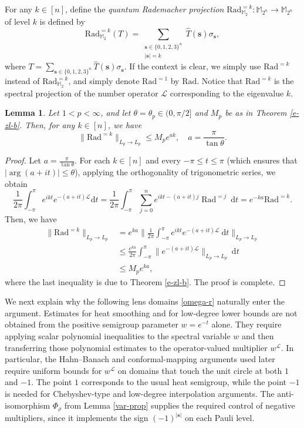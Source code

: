 \documentclass{amsbook}
\newtheorem{lemma}[theorem]{Lemma}
\theoremstyle{definition}
\theoremstyle{remark}
\numberwithin{section}{chapter}
\numberwithin{equation}{chapter}
\newcommand{\1}{\mathbf{1}}
\newcommand{\s}{\mathbf{s}}
\begin{document}
For any $k\in [n]$, define the \emph{quantum Rademacher projection} $\mathrm{Rad}^{=k}_{\mathbb{M}_2}:\mathbb{M}_{2^n}\to\mathbb{M}_{2^n}$ of level $k$ is defined by
\begin{equation}
\mathrm{Rad}^{=k}_{\mathbb{M}_2}(T) = \sum_{\substack{\mathbf{s} \in \{0,1,2,3\}^n \\ |\mathbf{s}| =k}} \widehat{T}(\mathbf{s}) \sigma_{\mathbf{s}},
\end{equation}
where $T=\sum_{\mathbf{s} \in \{0,1,2,3\}^n} \widehat{T}(\mathbf{s}) \sigma_{\mathbf{s}}$. If the context is clear, we simply use $\mathrm{Rad}^{=k}$ instead of $\mathrm{Rad}^{=k}_{\mathbb{M}_2}$, and simply denote $\mathrm{Rad}^{=1}$ by $\mathrm{Rad}$. Notice that $\mathrm{Rad}^{=k}$ is the spectral projection of the number operator $\mathcal L$ corresponding to the eigenvalue $k$.

\begin{lemma}\label{radk-pp-ak}
Let $1<p<\infty$, and let $\theta=\theta_p\in(0,\pi/2]$ and $M_p$ be as in Theorem \ref{e-zl-b}. Then, for any $k \in[n]$, we have
$$\|\mathrm{Rad}^{=k}\|_{L_{p}\rightarrow L_{p}}\leq M_pe^{ak},\quad a=\frac{\pi}{\tan \theta}.$$
\end{lemma}

\begin{proof} Let $a=\frac{\pi}{\tan \theta}$.  For each $k \in[n]$ and every $-\pi \leq t\leq \pi$ (which ensures that $|\arg (a+it)|\leq \theta$),
applying the orthogonality of trigonometric series, we obtain
$$
\frac{1}{2 \pi} \int_{-\pi}^{\pi} e^{i k t} e^{-(a+i t) \mathcal{L}} \mathrm{d} t=\frac{1}{2 \pi} \int_{-\pi}^{\pi} \sum_{j=0}^{n} e^{i k t-(a+i t) j} \operatorname{Rad}^{=j} \mathrm{~d} t=e^{-k a} \mathrm{Rad}^{=k}.$$
Then, we have 
\begin{align*}
 \|\mathrm{Rad}^{=k}\|_{L_{p}\rightarrow L_{p}}
&=e^{k a}\|\frac{1}{2 \pi} \int_{-\pi}^{\pi} e^{i k t} e^{-(a+i t) \mathcal{L}}\mathrm{~d}t\|_{L_{p}\rightarrow L_{p}} \\
&\leq \frac{e^{k a}}{2 \pi} \int_{-\pi}^{\pi}\|e^{-(a+i t) \mathcal{L}}\|_{L_{p}\rightarrow L_{p}} \mathrm{~d}t \\
&\leq M_p e^{ka}, 
\end{align*}
where the last inequality is due to Theorem \ref{e-zl-b}. The proof is complete.
\end{proof}

We next explain why the following lens domains \eqref{omega-r} naturally enter the argument.  Estimates for heat smoothing and for low-degree lower bounds are not obtained from the positive semigroup parameter $w=e^{-t}$ alone.  They require applying scalar polynomial inequalities to the spectral variable $w$ and then transferring those polynomial estimates to the operator-valued multiplier $w^{\mathcal L}$.  In particular, the Hahn--Banach and conformal-mapping arguments used later require uniform bounds for $w^{\mathcal L}$ on domains that touch the unit circle at both $1$ and $-1$.  The point $1$ corresponds to the usual heat semigroup, while the point $-1$ is needed for Chebyshev-type and low-degree interpolation arguments.  The anti-isomorphism $\Phi_\rho$ from Lemma \ref{var-prop} supplies the required control of negative multipliers, since it implements the sign $(-1)^{|\s|}$ on each Pauli level.
\end{document}

